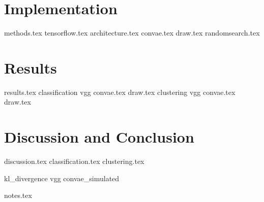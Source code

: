 \documentclass[12pt]{uiofysmaster}
\begin{document}

\part{Implementation}

{methods.tex}
{tensorflow.tex}
{architecture.tex}
{convae.tex}
{draw.tex}
{randomsearch.tex}

\part{Results}
{results.tex}
{classification}
{vgg}
{convae.tex}
{draw.tex}
{clustering}
{vgg}
{convae.tex}
{draw.tex}


\part{Discussion and Conclusion}
{discussion.tex}
{classification.tex}
{clustering.tex}

\begin{appendices}
{kl_divergence}
{vgg}
{convae_simulated}
\end{appendices}

{notes.tex}


% 


\end{document}

